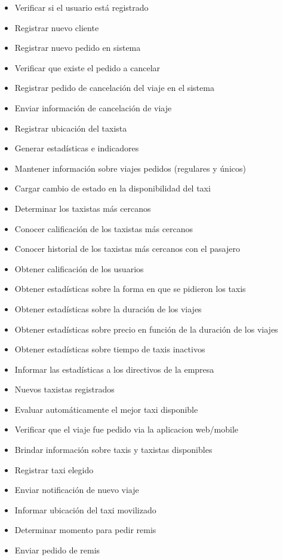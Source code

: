 \documentclass[a4paper]{article}
\begin{document}
\begin{itemize}
\item Verificar si el usuario est\'a registrado
\item Registrar nuevo cliente
\item Registrar nuevo pedido en sistema
\item Verificar que existe el pedido a cancelar
\item Registrar pedido de cancelaci\'on del viaje en el sistema
\item Enviar informaci\'on de cancelaci\'on de viaje
\item Registrar ubicaci\'on del taxista
\item Generar estad\'isticas e indicadores
\item Mantener informaci\'on sobre viajes pedidos (regulares  y \'unicos)
\item Cargar cambio de estado en la disponibilidad del taxi
\item Determinar los taxistas m\'as cercanos
\item Conocer calificaci\'on de los taxistas m\'as cercanos
\item Conocer historial de los taxistas m\'as cercanos con el pasajero
\item Obtener calificaci\'on de los usuarios
\item Obtener estad\'isticas sobre la forma en que se pidieron los taxis
\item Obtener estad\'isticas sobre la duraci\'on de los viajes
\item Obtener estad\'isticas sobre precio en funci\'on de la duraci\'on de los viajes
\item Obtener estad\'isticas sobre tiempo de taxis inactivos
\item Informar las estad\'isticas a los directivos de la empresa
\item Nuevos taxistas registrados
\item Evaluar autom\'aticamente el mejor taxi disponible
\item Verificar que el viaje fue pedido via la aplicacion web/mobile
\item Brindar informaci\'on sobre taxis y taxistas disponibles
\item Registrar taxi elegido
\item Enviar notificaci\'on de nuevo viaje
\item Informar ubicaci\'on del taxi movilizado
\item Determinar momento para pedir remis
\item Enviar pedido de remis

\end{itemize}
\end{document}
